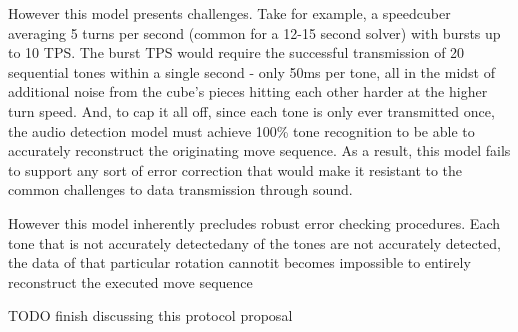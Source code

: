 However this model presents challenges. Take for example, a speedcuber averaging 5 turns per second (common for a 12-15 second solver) with bursts up to 10 TPS. The burst TPS would require the successful transmission of 20 sequential tones within a single second - only 50ms per tone, all in the midst of additional noise from the cube's pieces hitting each other harder at the higher turn speed. And, to cap it all off, since each tone is only ever transmitted once, the audio detection model must achieve 100\% tone recognition to be able to accurately reconstruct the originating move sequence. As a result, this model fails to support any sort of error correction that would make it resistant to the common challenges to data transmission through sound.

However this model inherently precludes robust error checking procedures. Each tone that is not accurately detectedany of the tones are not accurately detected, the data of that particular rotation cannotit becomes impossible to entirely reconstruct the executed move sequence

TODO finish discussing this protocol proposal


